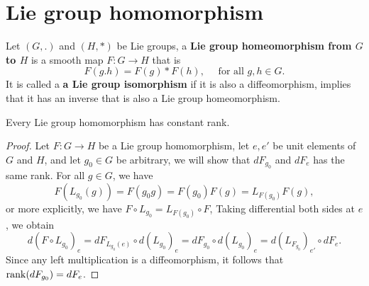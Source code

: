 \section{Lie group homomorphism}
\begin{definition}
    Let $(G,.)$ and $(H,*)$ be Lie groups, a \textbf{Lie group homeomorphism from $G$ to $H$} is a smooth map $F: G \to H$ that is 
    \[
        F(g.h) = F(g)*F(h),\quad \text{ for all }g,h \in G.
    \]
    It is called a \textbf{a Lie group isomorphism} if it is also a diffeomorphism, implies that it has an inverse that is also a Lie group homeomorphism.
\end{definition}
\begin{theorem}
    Every Lie group homomorphism has constant rank.
\end{theorem}
\begin{proof}
    Let $F: G \to H$ be a Lie group homomorphism, let $e,e'$ be unit elements of $G$ and $H$, and let  $g_0 \in G$ be arbitrary, we will show that $dF_{g_0}$ and $dF_e$ has the same rank. For all $g \in G$, we have 
    \[
        F(L_{g_0}(g)) = F(g_0g) = F(g_0)F(g) = L_{F(g_0)}F(g),
    \] 
    or more explicitly, we have $F \circ L_{g_0} = L_{F(g_0)}\circ F$, Taking differential both sides at $e$, we obtain 
    \[
        d(F\circ L_{g_0})_e  = dF_{L_{g_0}(e)}\circ d(L_{g_0})_e = dF_{g_0}\circ d(L_{g_0})_e = d(L_{F_{g_0}})_{e'}\circ dF_e.
    \]
    Since any left multiplication is a diffeomorphism, it follows that $\mathrm{rank}( dF_{g_0}) = dF_e$.
\end{proof}